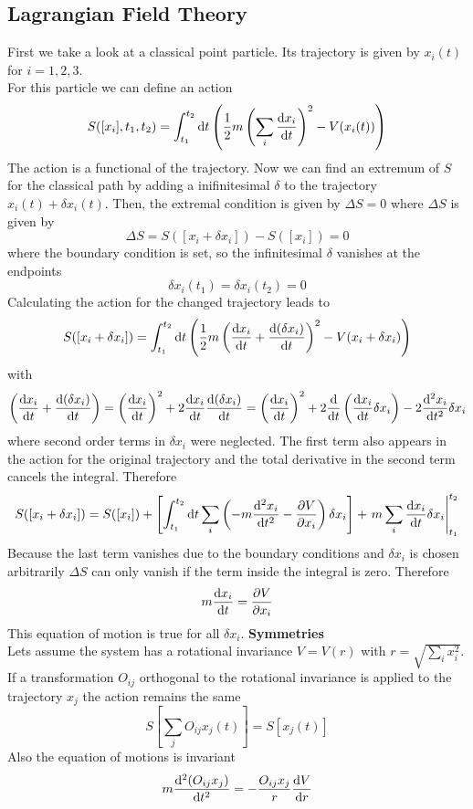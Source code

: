 \documentclass{include/thesisclass}
\newcommand{\dd}{{\rm d}}
\newcommand{\p}{\partial}
\begin{document}
\subsection{Lagrangian Field Theory}
First we take a look at a classical point particle. Its trajectory is given by $x_i(t)$ for $i = 1,2,3$.\\
For this particle we can define an action
\[ S( [x_i], t_1, t_2 ) = \int_{t_1}^{t_2} \dd t \left(\frac{1}{2} m \left( \sum_i \frac{\dd x_i}{\dd t} \right)^2 - V(x_i(t)) \right)
\]
The action is a functional of the trajectory. Now we can find an extremum of $S$ for the classical path by adding a inifinitesimal $\delta$ to the trajectory $x_i(t) + \delta x_i(t)$. Then, the extremal condition is given by $\Delta S = 0$ where $\Delta S$ is given by
\[ \Delta S = S( [x_i + \delta x_i]) - S([x_i]) = 0\]
where the boundary condition is set, so the infinitesimal $\delta$ vanishes at the endpoints
\[ \delta x_i(t_1) = \delta x_i(t_2) = 0\]
Calculating the action for the changed trajectory leads to
\[ S( [x_i + \delta x_i]) = \int_{t_1}^{t_2} \dd t \left( \frac{1}{2} m \left( \frac{\dd x_i}{\dd t} + \frac{\dd (\delta x_i)}{\dd t} \right)^2 - V(x_i + \delta x_i) \right)
\]
with
\[  \left( \frac{\dd x_i}{\dd t} + \frac{ \dd ( \delta x_i)}{\dd t} \right) = \left( \frac{ \dd x_i}{\dd t} \right)^2 + 2 \frac{ \dd x_i }{\dd t} \frac{ \dd (\delta x_i)}{\dd t} = \left( \frac{\dd x_i}{\dd t} \right)^2 + 2 \frac{\dd}{\dd t} \left( \frac{\dd x_i}{\dd t} \delta x_i \right) - 2 \frac{ \dd ^2 x_i}{\dd t^2} \delta x_i\]
where second order terms in $\delta x_i$ were neglected. The first term also appears in the action for the original trajectory and the total derivative in the second term cancels the integral. Therefore
\[ 
S( [x_i + \delta x_i]) = S([x_i]) + \left[ \int_{t_1}^{t_2} \dd t \sum_i \left( -m \frac{\dd ^2 x_i}{\dd t^2} - \frac{\p V}{\p x_i} \right) \delta x_i \right] + \left. m \sum_i \frac{\dd x_i}{\dd t} \delta x_i \right|_{t_1}^{t_2}
\]
Because the last term vanishes due to the boundary conditions and $\delta x_i$ is chosen arbitrarily $\Delta S$ can only vanish if the term inside the integral is zero. Therefore
\[ 
m \frac{\dd x_i }{\dd t} = \frac{\p V}{\p x_i}
\]
This equation of motion is true for all $\delta x_i$.
\newline\newline
\textbf{Symmetries}\\
Lets assume the system has a rotational invariance $V = V(r)$ with $r = \sqrt{ \sum_i x_i^2}$. If a transformation $O_{ij}$ orthogonal to the rotational invariance is applied to the trajectory $x_j$ the action remains the same
\[ S[ \sum_j O_{ij} x_j (t) ] = S[x_j(t)]\]
Also the equation of motions is invariant
\[ m \frac{ \dd^2 ( O_{ij} x_j)}{\dd t^2} = - \frac{ O_{ij} x_j}{r} \frac{\dd V}{\dd r} \]
\end{document}
